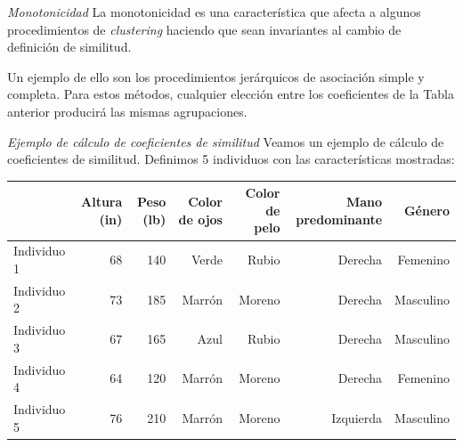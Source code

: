 \documentclass[spanish]{beamer}
\begin{document}
\begin{frame}{\textit{Monotonicidad}}
La monotonicidad es una característica que afecta a algunos procedimientos de \textit{clustering} haciendo que sean invariantes al cambio de definición de similitud.\break 

Un ejemplo de ello son los procedimientos jerárquicos de asociación simple y completa. Para estos métodos, cualquier elección entre los coeficientes de la Tabla anterior producirá las mismas agrupaciones.
\end{frame}

\begin{frame}{\textit{Ejemplo de cálculo de coeficientes de similitud}}
Veamos un ejemplo de cálculo de coeficientes de similitud.\break
Definimos 5 individuos con las características mostradas:
\begin{table}[h]
  \centering
  \label{tab:ej-similitud}
\resizebox{11cm}{!} {
  \begin{tabular}{lrrrrrr}
    \toprule
            & Altura (in) & Peso (lb) & Color de ojos & Color de pelo & Mano predominante & Género \\ \midrule
Individuo 1 & 68                       & 140                    & Verde                             & Rubio                             & Derecha                               & Femenino\\
Individuo 2 & 73 & 185 & Marrón & Moreno & Derecha & Masculino                  \\
Individuo 3 & 67 & 165 & Azul & Rubio & Derecha & Masculino                  \\
Individuo 4 & 64 & 120 & Marrón & Moreno                            & Derecha & Femenino \\
Individuo 5 & 76 & 210 & Marrón & Moreno & Izquierda & Masculino                 
\end{tabular}
}
\end{table}
\end{frame}
\end{document}
